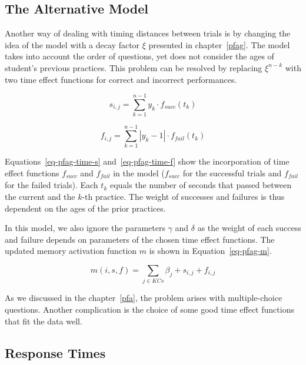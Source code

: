 \subsection{The Alternative Model}
\label{pfagt}

Another way of dealing with timing distances between trials is by changing the idea of the model with a decay factor $\xi$ presented in chapter~\ref{pfag}. The model takes into account the order of questions, yet does not consider the ages of student's previous practices. This problem can be resolved by replacing $\xi^{n-k}$ with two time effect functions for correct and incorrect performances.

\begin{equation} \label{eq-pfag-time-s}
  s_{i,j} = \sum_{k=1}^{n-1} y_k \cdot f_{\mathit{succ}}(t_k)
\end{equation}

\begin{equation} \label{eq-pfag-time-f}
  f_{i,j} = \sum_{k=1}^{n-1} |y_k - 1| \cdot f_{\mathit{fail}}(t_k)
\end{equation}

Equations~\ref{eq-pfag-time-s} and~\ref{eq-pfag-time-f} show the incorporation of time effect functions $f_{\mathit{succ}}$ and $f_{\mathit{fail}}$ in the model ($f_{\mathit{succ}}$ for the successful trials and $f_{\mathit{fail}}$ for the failed trials). Each $t_k$ equals the number of seconds that passed between the current and the $k$-th practice. The weight of successes and failures is thus dependent on the ages of the prior practices.

In this model, we also ignore the parameters $\gamma$ and $\delta$ as the weight of each success and failure depends on parameters of the chosen time effect functions. The updated memory activation function $m$ is shown in Equation~\ref{eq-pfag-m}.

\begin{equation} \label{eq-pfag-m}
  m(i,s,f) = \sum_{j \in KCs} \beta_j + s_{i,j} + f_{i,j} 
\end{equation}

As we discussed in the chapter~\ref{pfa}, the problem arises with multiple-choice questions. Another complication is the choice of some good time effect functions that fit the data well.

\subsection{Response Times}
\label{pfart}

